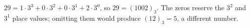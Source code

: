 $29=1\cdot3^3+0\cdot3^2+0\cdot3^1+2\cdot3^0$, so $\boxed{29=(1002)_3}$. The zeros reserve the $3^2$ and $3^1$ place values; omitting them would produce $(12)_3=5$, a different number.
